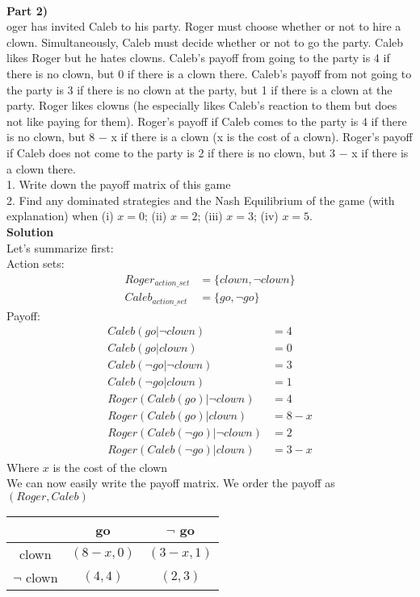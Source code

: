 \documentclass[12pt,letter]{article}
\newcommand{\ppart}[1]{\vspace{2mm}\large\textbf{\\Part {#1})\vspace{2mm}}\normalsize\\}
\begin{document}
\ppart{2}
oger has invited Caleb to his party. Roger must choose whether or not to hire a
clown. Simultaneously, Caleb must decide whether or not to go the party. Caleb 
likes Roger but he hates clowns. Caleb’s payoff from going to the party is 4 if 
there is no clown, but 0 if there is a clown there. Caleb’s payoff from not going 
to the party is 3 if there is no clown at the party, but 1 if there is a clown 
at the party. Roger likes clowns (he especially likes Caleb’s reaction to them but
does not like paying for them). Roger’s payoff if Caleb comes to the party is 4 
if there is no clown, but 8 − x if there is a clown (x is the cost of a clown). 
Roger’s payoff if Caleb does not come to the party is 2 if there is no clown, 
but 3 − x if there is a clown there.
\\
1. Write down the payoff matrix of this game
\\
2. Find any dominated strategies and the Nash Equilibrium of the game (with
explanation) when (i) $x=0$; (ii) $x=2$; (iii) $x=3$; (iv) $x=5$.
\\
\large\textbf{Solution}\normalsize
\\
Let's summarize first:
\\
Action sets:
\begin{align*}
	Roger_{action\_set} &= \{clown, \neg clown\} \\
	Caleb_{action\_set} &= \{go, \neg go\} 
\end{align*}
Payoff:
\begin{align*}
	Caleb(go | \neg clown) &= 4 \\
	Caleb(go | clown) &= 0 \\
	Caleb(\neg go | \neg clown) &= 3 \\
	Caleb(\neg go | clown) &= 1 \\
	Roger(Caleb(go) | \neg clown) &= 4 \\
	Roger(Caleb(go) | clown) &= 8 - x \\
	Roger(Caleb(\neg go) | \neg clown) &= 2 \\
	Roger(Caleb(\neg go) | clown) &= 3 - x
\end{align*}
Where $x$ is the cost of the clown
\\
We can now easily write the payoff matrix. We order the payoff as $(Roger,Caleb)$
\begin{figure*}[h]
\centering
\begin{tabular}{|c|c|c|}
	\hline
	& go & $\neg$ go\\
	\hline
	clown & $(8-x,0)$ & $(3-x,1)$\\
	\hline
	$\neg$ clown & $(4,4)$ & $(2,3)$\\
	\hline
\end{tabular}
\end{figure*}
\end{document}

